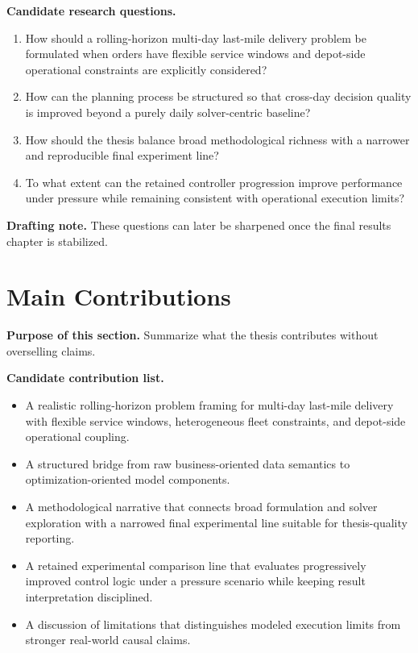 \textbf{Candidate research questions.}
\begin{enumerate}
    \item How should a rolling-horizon multi-day last-mile delivery problem be formulated when orders have flexible service windows and depot-side operational constraints are explicitly considered?
    \item How can the planning process be structured so that cross-day decision quality is improved beyond a purely daily solver-centric baseline?
    \item How should the thesis balance broad methodological richness with a narrower and reproducible final experiment line?
    \item To what extent can the retained controller progression improve performance under pressure while remaining consistent with operational execution limits?
\end{enumerate}

\textbf{Drafting note.}
These questions can later be sharpened once the final results chapter is stabilized.

\section{Main Contributions}
\label{sec:intro:contributions}

\textbf{Purpose of this section.}
Summarize what the thesis contributes without overselling claims.

\textbf{Candidate contribution list.}
\begin{itemize}
    \item A realistic rolling-horizon problem framing for multi-day last-mile delivery with flexible service windows, heterogeneous fleet constraints, and depot-side operational coupling.
    \item A structured bridge from raw business-oriented data semantics to optimization-oriented model components.
    \item A methodological narrative that connects broad formulation and solver exploration with a narrowed final experimental line suitable for thesis-quality reporting.
    \item A retained experimental comparison line that evaluates progressively improved control logic under a pressure scenario while keeping result interpretation disciplined.
    \item A discussion of limitations that distinguishes modeled execution limits from stronger real-world causal claims.
\end{itemize}

